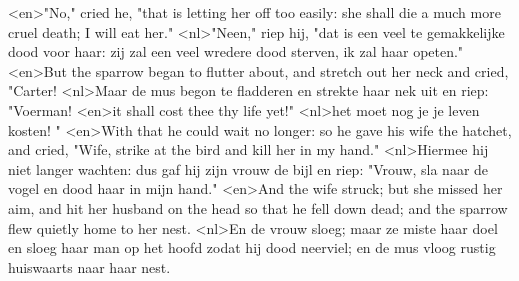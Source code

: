 <en>"No," cried he, "that is letting her off too easily: she shall die a much more cruel death; I will eat her."
<nl>"Neen," riep hij, "dat is een veel te gemakkelijke dood voor haar: zij zal een veel wredere dood sterven, ik zal haar opeten."
<en>But the sparrow began to flutter about, and stretch out her neck and cried, "Carter!
<nl>Maar de mus begon te fladderen en strekte haar nek uit en riep: "Voerman!
<en>it shall cost thee thy life yet!"
<nl>het moet nog je je leven kosten! "
<en>With that he could wait no longer: so he gave his wife the hatchet, and cried, "Wife, strike at the bird and kill her in my hand."
<nl>Hiermee hij niet langer wachten: dus gaf hij zijn vrouw de bijl en riep: "Vrouw, sla naar de vogel en dood haar in mijn hand."
<en>And the wife struck; but she missed her aim, and hit her husband on the head so that he fell down dead; and the sparrow flew quietly home to her nest.
<nl>En de vrouw sloeg; maar ze miste haar doel en sloeg haar man op het hoofd zodat hij dood neerviel; en de mus vloog rustig huiswaarts naar haar nest.
